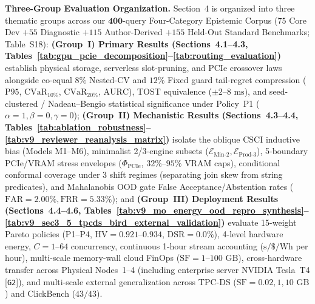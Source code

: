 \documentclass[10pt,a4paper]{article}
\begin{document}
\par\vspace{3pt}\noindent\textbf{Three-Group Evaluation Organization.} Section~4 is organized into three thematic groups across our $\mathbf{400}$-query Four-Category Epistemic Corpus ($75$ Core Dev $+ 55$ Diagnostic $+ 115$ Author-Derived $+ 155$ Held-Out Standard Benchmarks; Table~S18): \textbf{(Group~I) Primary Results (Sections~4.1--4.3, Tables~\ref{tab:gpu_pcie_decomposition}--\ref{tab:routing_evaluation})} establish physical storage, serverless slot-pruning, and PCIe crossover laws alongside co-equal $8\%$ Nested-CV and $12\%$ Fixed guard tail-regret compression ($\text{P95}$, $\text{CVaR}_{10\%}$, $\text{CVaR}_{20\%}$, $\text{AURC}$), TOST equivalence ($\pm 2\text{--}8\text{ ms}$), and seed-clustered / Nadeau--Bengio statistical significance under Policy~P1 ($\alpha=1,\beta=0,\gamma=0$); \textbf{(Group~II) Mechanistic Results (Sections~4.3--4.4, Tables~\ref{tab:ablation_robustness}--\ref{tab:v9_reviewer_reanalysis_matrix})} isolate the oblique $\text{CSCI}$ inductive bias (Models M1--M6), minimalist 2/3-engine subsets ($\mathcal{E}_{\text{Min-2}}, \mathcal{E}_{\text{Prod-3}}$), 5-boundary PCIe/VRAM stress envelopes ($\Phi_{\text{PCIe}}$, $32\%\text{--}95\%$ VRAM caps), conditional conformal coverage under 3 shift regimes (separating join skew from string predicates), and Mahalanobis OOD gate False Acceptance/Abstention rates ($\text{FAR}=2.00\%, \text{FRR}=5.33\%$); and \textbf{(Group~III) Deployment Results (Sections~4.4--4.6, Tables~\ref{tab:v9_mo_energy_ood_repro_synthesis}--\ref{tab:v9_sec3_5_tpcds_bird_external_validation})} evaluate 15-weight Pareto policies (P1--P4, $\text{HV}=0.921\text{--}0.934$, $\text{DSR}=0.0\%$), 4-level hardware energy, $C=1\text{--}64$ concurrency, continuous 1-hour stream accounting ($\text{s}/\$/\text{Wh}$ per hour), multi-scale memory-wall cloud FinOps ($\text{SF}=1\text{--}100\text{ GB}$), cross-hardware transfer across Physical Nodes~1--4 (including enterprise server NVIDIA Tesla~T4 [\texttt{G2}]), and multi-scale external generalization across TPC-DS ($\text{SF}=0.02, 1, 10\text{ GB}$) and ClickBench ($43/43$).
\end{document}
